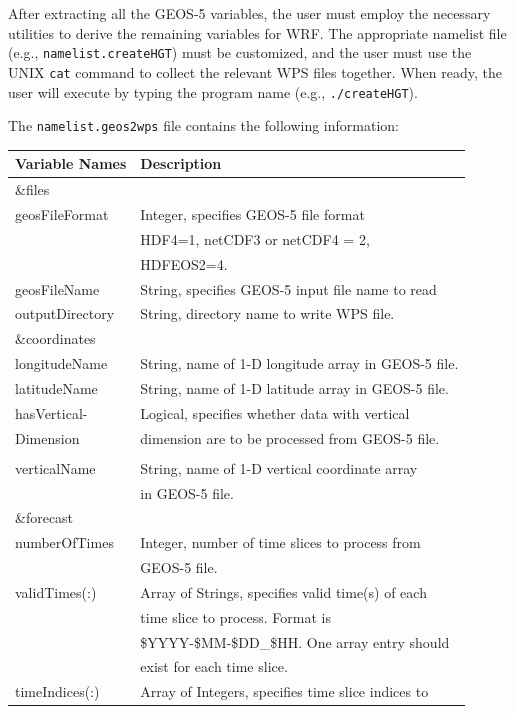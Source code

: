 After extracting all the GEOS-5 variables, the user must employ the necessary
utilities to derive the remaining variables for WRF. The appropriate namelist
file (e.g., \texttt{namelist.createHGT}) must be customized, and the user must
use the UNIX \texttt{cat} command to collect the relevant WPS files together.
When ready, the user will execute by typing the program name (e.g., 
\texttt{./createHGT}).

\newpage
The \texttt{namelist.geos2wps} file contains the following information:

\begin{tabular}{|l|l|} \hline
Variable Names & Description \\ \hline
\&files          & \\ \hline
geosFileFormat & Integer, specifies GEOS-5 file format \\
 & HDF4=1, netCDF3 or netCDF4 = 2, \\
 & HDFEOS2=4. \\ \hline
geosFileName & String, specifies GEOS-5 input file name to read \\ 
outputDirectory & String, directory name to write WPS file. \\  \hline
\&coordinates & \\ \hline
longitudeName & String, name of 1-D longitude array in GEOS-5 file. \\ \hline
latitudeName & String, name of 1-D latitude array in GEOS-5 file. \\ \hline
hasVertical- & Logical, specifies whether data with vertical \\
Dimension & dimension are to be processed from GEOS-5 file. \\ \hline
 & \\
verticalName & String, name of 1-D vertical coordinate array \\ 
& in GEOS-5 file. \\ \hline
\&forecast & \\ \hline
numberOfTimes & Integer, number of time slices to process from\\
& GEOS-5 file. \\ \hline
validTimes(:) & Array of Strings, specifies valid time(s) of each \\
&time slice to process. Format is \\ 
& \$YYYY-\$MM-\$DD\_\$HH. One array entry should \\
& exist for each time slice. \\ \hline
timeIndices(:) & Array of Integers, specifies time slice indices to \\

\end{tabular}
